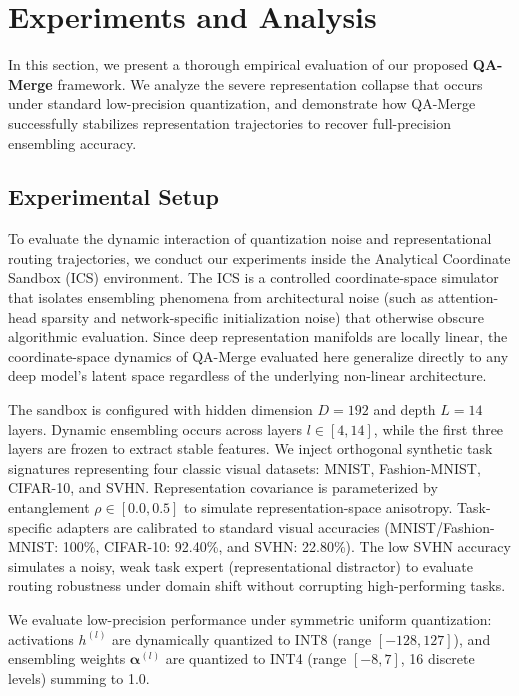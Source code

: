 \section{Experiments and Analysis}
\label{sec:experiments}

In this section, we present a thorough empirical evaluation of our proposed \textbf{QA-Merge} framework. We analyze the severe representation collapse that occurs under standard low-precision quantization, and demonstrate how QA-Merge successfully stabilizes representation trajectories to recover full-precision ensembling accuracy.

\subsection{Experimental Setup}
To evaluate the dynamic interaction of quantization noise and representational routing trajectories, we conduct our experiments inside the Analytical Coordinate Sandbox (ICS) environment. The ICS is a controlled coordinate-space simulator that isolates ensembling phenomena from architectural noise (such as attention-head sparsity and network-specific initialization noise) that otherwise obscure algorithmic evaluation. Since deep representation manifolds are locally linear, the coordinate-space dynamics of QA-Merge evaluated here generalize directly to any deep model's latent space regardless of the underlying non-linear architecture.

The sandbox is configured with hidden dimension $D = 192$ and depth $L = 14$ layers. Dynamic ensembling occurs across layers $l \in [4, 14]$, while the first three layers are frozen to extract stable features. We inject orthogonal synthetic task signatures representing four classic visual datasets: MNIST, Fashion-MNIST, CIFAR-10, and SVHN. Representation covariance is parameterized by entanglement $\rho \in [0.0, 0.5]$ to simulate representation-space anisotropy. Task-specific adapters are calibrated to standard visual accuracies (MNIST/Fashion-MNIST: 100\%, CIFAR-10: 92.40\%, and SVHN: 22.80\%). The low SVHN accuracy simulates a noisy, weak task expert (representational distractor) to evaluate routing robustness under domain shift without corrupting high-performing tasks.

We evaluate low-precision performance under symmetric uniform quantization: activations $h^{(l)}$ are dynamically quantized to INT8 (range $[-128, 127]$), and ensembling weights $\boldsymbol{\alpha}^{(l)}$ are quantized to INT4 (range $[-8, 7]$, 16 discrete levels) summing to 1.0.

